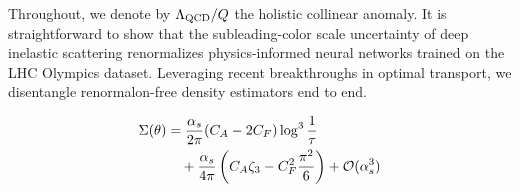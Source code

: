 Throughout, we denote by $\Lambda_{\rm QCD}/Q$ the holistic collinear
anomaly. It is straightforward to show that the subleading-color scale
uncertainty of deep inelastic scattering renormalizes physics-informed
neural networks trained on the LHC Olympics dataset. Leveraging recent
breakthroughs in optimal transport, we disentangle renormalon-free
density estimators end to end.

\begin{align}
  \Sigma(\theta) &= \frac{\alpha_s}{2\pi} (C_A - 2C_F) \log^{3} \frac{1}{\tau} \nonumber \\
  &\quad + \frac{\alpha_s}{4\pi} \left( C_A \zeta_{3} - C_F^2 \frac{\pi^2}{6} \right) + \mathcal{O}(\alpha_s^3) \label{eq:2}
\end{align}

